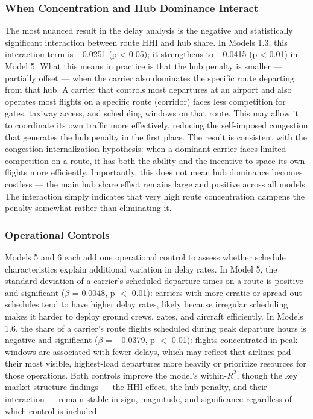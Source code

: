 \documentclass[preprint,12pt,authoryear]{elsarticle}
\begin{document}
\subsubsection{When Concentration and Hub Dominance Interact}

The most nuanced result in the delay analysis is the negative and statistically significant interaction between route HHI and hub share. In Models 1.3, this interaction term is −0.0251 (p < 0.05); it strengthens to −0.0415 (p < 0.01) in Model 5. What this means in practice is that the hub penalty is smaller — partially offset — when the carrier also dominates the specific route departing from that hub. A carrier that controls most departures at an airport and also operates most flights on a specific route (corridor) faces less competition for gates, taxiway access, and scheduling windows on that route. This may allow it to coordinate its own traffic more effectively, reducing the self-imposed congestion that generates the hub penalty in the first place. The result is consistent with the congestion internalization hypothesis: when a dominant carrier faces limited competition on a route, it has both the ability and the incentive to space its own flights more efficiently. Importantly, this does not mean hub dominance becomes costless — the main hub share effect remains large and positive across all models. The interaction simply indicates that very high route concentration dampens the penalty somewhat rather than eliminating it.

\subsubsection{Operational Controls}

Models 5 and 6 each add one operational control to assess whether schedule characteristics explain additional variation in delay rates. In Model 5, the standard deviation of a carrier's scheduled departure times on a route is positive and significant ($\beta$ = 0.0048, p $<$ 0.01): carriers with more erratic or spread-out schedules tend to have higher delay rates, likely because irregular scheduling makes it harder to deploy ground crews, gates, and aircraft efficiently. In Models 1.6, the share of a carrier's route flights scheduled during peak departure hours is negative and significant ($\beta$ = −0.0379, p $<$ 0.01): flights concentrated in peak windows are associated with fewer delays, which may reflect that airlines pad their most visible, highest-load departures more heavily or prioritize resources for those operations. Both controls improve the model's within-$R^2$, though the key market structure findings — the HHI effect, the hub penalty, and their interaction --- remain stable in sign, magnitude, and significance regardless of which control is included.
\end{document}
